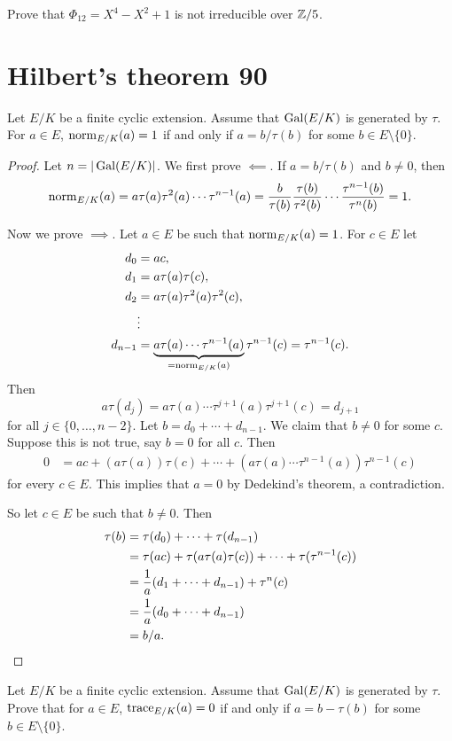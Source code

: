 \begin{exercise}
Prove that
$\Phi_{12}=X^4-X^2+1$ is not irreducible over $\mathbb{Z}/5$. 
\end{exercise}

\section{Hilbert's theorem 90}

\begin{theorem}[Hilbert]
    Let $E/K$ be a finite cyclic extension. Assume that 
    $\operatorname{Gal}(E/K)$ is generated by $\tau$. For 
    $a\in E$, $\operatorname{norm}_{E/K}(a)=1$ if and only 
    if $a=b/\tau(b)$ for some $b\in E\setminus\{0\}$. 
\end{theorem}

\begin{proof}
    Let $n=|\operatorname{Gal}(E/K)|$. We first prove $\impliedby$. If $a=b/\tau(b)$ and $b\ne 0$, then 
    \[
    \operatorname{norm}_{E/K}(a)=a\tau(a)\tau^2(a)\cdots\tau^{n-1}(a)
    =\frac{b}{\tau(b)}\frac{\tau(b)}{\tau^2(b)}\cdots\frac{\tau^{n-1}(b)}{\tau^n(b)}=1.
    \]

    Now we prove $\implies$. Let $a\in E$ be such that $\operatorname{norm}_{E/K}(a)=1$. For 
    $c\in E$ let 
    \begin{align*}
        d_0 &= ac,\\
        d_1 &= a\tau(a)\tau(c),\\
        d_2 &= a\tau(a)\tau^2(a)\tau^2(c),\\
        &\vdots\\
        d_{n-1} &= \underbrace{a\tau(a)\cdots\tau^{n-1}(a)}_{=\operatorname{norm}_{E/K}(a)}\tau^{n-1}(c)=\tau^{n-1}(c).
    \end{align*}
    Then 
    \[
    a\tau(d_j)=a\tau(a)\cdots\tau^{j+1}(a)\tau^{j+1}(c)=d_{j+1}
    \]
    for all $j\in\{0,\dots,n-2\}$. Let $b=d_0+\cdots+d_{n-1}$. We claim that 
    $b\ne 0$ for some $c$. Suppose this is not true, say $b=0$ for all $c$. Then 
    \begin{align*}
    0&=ac+(a\tau(a))\tau(c)+\cdots+(a\tau(a)\cdots\tau^{n-1}(a))\tau^{n-1}(c)
    \end{align*}
    for every $c\in E$. This 
    implies that $a=0$ by Dedekind's theorem, a contradiction. 
    
    So let $c\in E$ be
    such that $b\ne 0$. Then 
    \begin{align*}
    \tau(b)&=\tau(d_0)+\cdots+\tau(d_{n-1})\\
    &=\tau(ac)+\tau(a\tau(a)\tau(c))+\cdots+\tau(\tau^{n-1}(c))\\
    &=\frac{1}{a}(d_1+\cdots+d_{n-1})+\tau^n(c)\\
    &=\frac{1}{a}(d_0+\cdots+d_{n-1})\\
    &=b/a.\qedhere
    \end{align*}
\end{proof}

\begin{exercise}
    Let $E/K$ be a finite cyclic extension. Assume that 
    $\operatorname{Gal}(E/K)$ is generated by $\tau$. Prove that for 
    $a\in E$, $\operatorname{trace}_{E/K}(a)=0$ if and only 
    if $a=b-\tau(b)$ for some $b\in E\setminus\{0\}$.  
\end{exercise}
